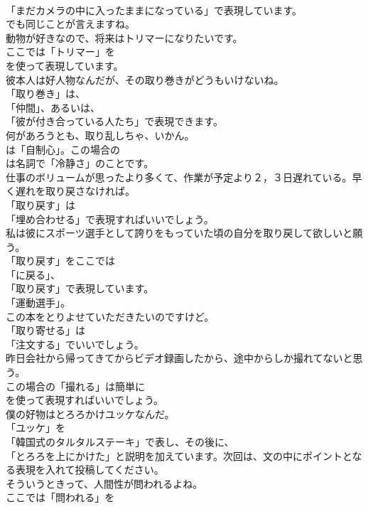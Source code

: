\documentclass[8pt]{extreport}
\begin{document}
\begin{CJK}{UTF8}{min}
\\	「まだカメラの中に入ったままになっている」で表現しています。
\\	でも同じことが言えますね。	
\\	動物が好きなので、将来はトリマーになりたいです。 
\\	ここでは「トリマー」を 
\\	を使って表現しています。	
\\	彼本人は好人物なんだが、その取り巻きがどうもいけないね。 
\\	「取り巻き」は、
\\	「仲間」、あるいは、
\\	「彼が付き合っている人たち」で表現できます。	
\\	何があろうとも、取り乱しちゃ、いかん。 
\\	は「自制心」。この場合の
\\	は名詞で「冷静さ」のことです。	
\\	仕事のボリュームが思ったより多くて、作業が予定より２，３日遅れている。早く遅れを取り戻さなければ。 
\\	「取り戻す」は
\\	「埋め合わせる」で表現すればいいでしょう。	
\\	私は彼にスポーツ選手として誇りをもっていた頃の自分を取り戻して欲しいと願う。 
\\	「取り戻す」をここでは
\\	「に戻る」、
\\	「取り戻す」で表現しています。
\\	「運動選手」。	
\\	この本をとりよせていただきたいのですけど。 
\\	「取り寄せる」は
\\	「注文する」でいいでしょう。	
\\	昨日会社から帰ってきてからビデオ録画したから、途中からしか撮れてないと思う。 
\\	この場合の「撮れる」は簡単に
\\	を使って表現すればいいでしょう。	
\\	僕の好物はとろろかけユッケなんだ。 
\\	「ユッケ」を
\\	「韓国式のタルタルステーキ」で表し、その後に、
\\	「とろろを上にかけた」と説明を加えています。次回は、文の中にポイントとなる表現を入れて投稿してください。	
\\	そういうときって、人間性が問われるよね。 
\\	ここでは「問われる」を

\end{CJK}
\end{document}
